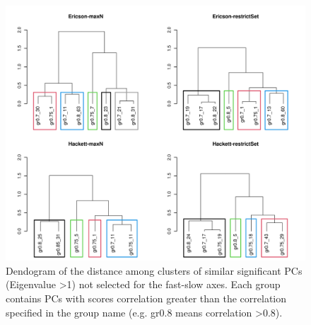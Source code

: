 \begin{figure}[ht!]
\centering
\includegraphics[width=.8\textwidth]{./Figures/Appendix2_1/2nd axes trees-1.png}
\caption[Cluster dendogram of the secondary axes]{
Dendogram of the distance among clusters of similar significant PCs (Eigenvalue
\textgreater{1}) not selected for the fast-slow axes. Each group contains PCs
with scores correlation greater than the correlation specified in the group name
(e.g. gr0.8 means correlation \textgreater{0.8}).}
\label{fig:figApp2.5}
\end{figure}
